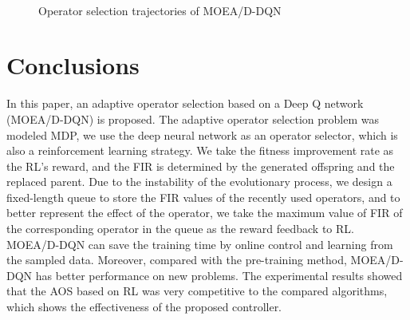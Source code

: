 \documentclass[journal]{IEEEtran}
\begin{document}
\begin{figure}[t]
  \hfil
  \\
  \caption{Operator selection trajectories of MOEA/D-DQN}
  \label{fig:tra}
\end{figure}



\section{Conclusions}
In this paper, an adaptive operator selection based on a Deep Q network (MOEA/D-DQN) is proposed.
The adaptive operator selection problem was modeled MDP, we use the deep neural network as an operator selector, which is also a reinforcement learning strategy.
We take the fitness improvement rate as the RL's reward, and the FIR is determined by the generated offspring and the replaced parent.
Due to the instability of the evolutionary process, we design a fixed-length queue to store the FIR values of the recently used operators, and to better represent the effect of the operator, we take the maximum value of FIR of the corresponding operator in the queue as the reward feedback to RL.
MOEA/D-DQN can save the training time by online control and learning from the sampled data. Moreover, compared with the pre-training method, MOEA/D-DQN has better performance on new problems.
The experimental results showed that the AOS based on RL was very competitive to the compared algorithms, which shows the effectiveness of the proposed controller.
\end{document}

